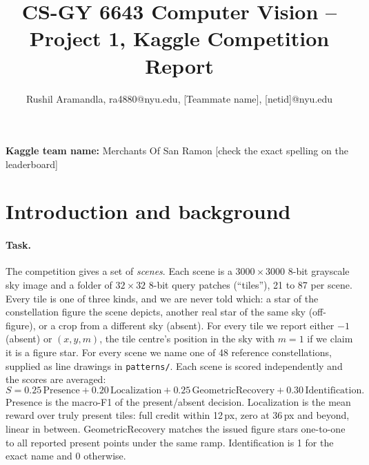 \documentclass[a4paper,11pt]{article}
\makeatletter
\renewcommand{\maketitle}{\bgroup\setlength{\parindent}{0pt}
\begin{flushleft}
  \thispagestyle{plain}
  \textbf{\@title}

  \@author
\end{flushleft}\egroup
}
\newcommand{\fillin}[1]{{\color{red}[#1]}}
\makeatother
\begin{document}
\title{\Large CS-GY 6643 Computer Vision -- Project 1, Kaggle Competition Report
\newline}
\author{Rushil Aramandla, ra4880@nyu.edu, \fillin{Teammate name}, \fillin{netid}@nyu.edu}


\date{}

\maketitle

\noindent
\textbf{Kaggle team name:} Merchants Of San Ramon \fillin{check the exact spelling on the leaderboard}\\

\section{Introduction and background}

\paragraph{Task.} The competition \parencite{kaggle2026constellation} gives a set of \emph{scenes}. Each scene is a
$3000\times3000$ 8-bit grayscale sky image and a folder of $32\times32$ 8-bit query patches (``tiles''), 21 to 87 per
scene. Every tile is one of three kinds, and we are never told which: a star of the constellation figure the scene
depicts, another real star of the same sky (off-figure), or a crop from a different sky (absent). For every tile we
report either $-1$ (absent) or $(x, y, m)$, the tile centre's position in the sky with $m=1$ if we claim it is a figure
star. For every scene we name one of 48 reference constellations, supplied as line drawings in \texttt{patterns/}. Each
scene is scored independently and the scores are averaged:
\begin{equation}
S = 0.25\,\mathrm{Presence} + 0.20\,\mathrm{Localization} + 0.25\,\mathrm{GeometricRecovery} + 0.30\,\mathrm{Identification}.
\end{equation}
Presence is the macro-F1 of the present/absent decision. Localization is the mean reward over truly present tiles:
full credit within 12\,px, zero at 36\,px and beyond, linear in between. GeometricRecovery matches the issued figure
stars one-to-one to all reported present points under the same ramp. Identification is 1 for the exact name and 0
otherwise.
\end{document}

